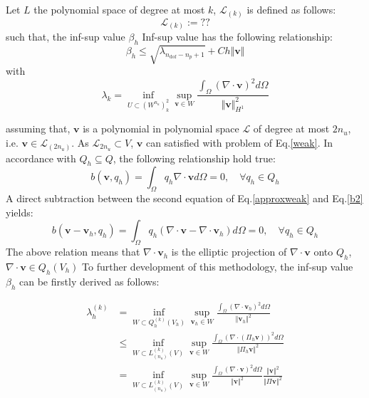 \begin{thm}
    Let $L$ the polynomial space of degree at most $k$, $\mathcal L_{(k)}$ is defined as follows:
\begin{equation}
    \mathcal L_{(k)} := ??
\end{equation}
such that, the inf-sup value $\beta_h$
    Inf-sup value has the following relationship:
\begin{equation}
    \beta_h \le \sqrt{\lambda_{n_{\textrm{dof}}-n_p+1}} + C h \Vert \boldsymbol v \Vert
\end{equation}
with
\begin{equation}
    \lambda_k = \inf_{U \subset (W^{n_{u}})^2_k} \sup_{\boldsymbol v \in W} 
    \frac{\int_\Omega (\nabla \cdot \boldsymbol v)^2 d\Omega}{\Vert \boldsymbol v \Vert_{H^1}^2}
\end{equation}
\end{thm}
\begin{pf}

\end{pf}
assuming that, $\boldsymbol v$ is a polynomial in polynomial space $\mathcal L$ of degree at most $2n_u$, i.e. $\boldsymbol v \in \mathcal L_{(2n_u)}$. 
As $\mathcal L_{2n_u} \subset V$, $\boldsymbol v$ can satisfied with problem of Eq.\eqref{weak}.
In accordance with $Q_h \subseteq Q$, the following relationship hold true:
\begin{equation}\label{b2}
b(\boldsymbol v,q_h) = \int_{\Omega} q_h \nabla \cdot \boldsymbol v d\Omega = 0, \quad \forall q_h \in Q_h
\end{equation}
A direct subtraction between the second equation of Eq.\eqref{approxweak} and Eq.\eqref{b2} yields: 
\begin{equation}
b(\boldsymbol v - \boldsymbol v_h, q_h) = \int_{\Omega} q_h (\nabla\cdot \boldsymbol v - \nabla \cdot \boldsymbol v_h)d\Omega = 0, \quad \forall q_h \in Q_h
\end{equation}
The above relation means that $\nabla \cdot \boldsymbol v_h$ is the elliptic projection of $\nabla \cdot \boldsymbol v$ onto $Q_h$, 
$\nabla \cdot \boldsymbol v \in Q_h(V_h)$
To further development of this methodology, the inf-sup value $\beta_h$ can be firstly derived as follows:


\begin{equation}
\begin{split}
    \lambda^{(k)}_h &= \inf_{W \subset Q_h^{(k)}(V_h)} \sup_{\boldsymbol v_h \in W} \frac{\int_{\Omega} (\nabla \cdot \boldsymbol v_h)^2 d\Omega}{\Vert \boldsymbol v_h \Vert^2} \\
    &\le \inf_{W \subset L^{(k)}_{(n_u)}(V)} \sup_{\boldsymbol v \in W} \frac{\int_{\Omega} (\nabla \cdot (\Pi_h \boldsymbol v))^2 d\Omega}{\Vert \Pi_h \boldsymbol v \Vert^2} \\
    &= \inf_{W \subset L^{(k)}_{(n_u)}(V)} \sup_{\boldsymbol v \in W} \frac{\int_{\Omega} (\nabla \cdot \boldsymbol v)^2 d\Omega}{\Vert \boldsymbol v \Vert^2}
    \frac{\Vert \boldsymbol v \Vert^2}{\Vert \Pi \boldsymbol v \Vert^2}\\
\end{split}
\end{equation}

